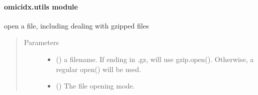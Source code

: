 \documentclass[letterpaper,10pt,english]{sphinxmanual}
\begin{document}

\begin{fulllineitems}
\label{\detokenize{omicidx.sra_parsers:omicidx.sra_parsers.try_update}}
\end{fulllineitems}



\paragraph{omicidx.utils module}
\label{\detokenize{omicidx.utils:module-omicidx.utils}}\label{\detokenize{omicidx.utils:omicidx-utils-module}}\label{\detokenize{omicidx.utils::doc}}

\begin{fulllineitems}
\label{\detokenize{omicidx.utils:omicidx.utils.open_file}}
open a file, including dealing with gzipped files
\begin{quote}\begin{description}
\item[{Parameters}] \leavevmode\begin{itemize}
\item {} 
 () \textendash{} a filename. If ending in .gz, will use gzip.open().
Otherwise, a regular open() will be used.

\item {} 
 () \textendash{} The file opening mode.

\end{itemize}

\end{description}\end{quote}

\end{fulllineitems}
\end{document}
